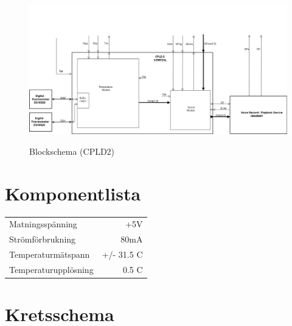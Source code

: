 \documentclass[a4paper,11pt]{article}
\begin{document}
		\begin{figure}[ht!tb]
		  \centering
		      \includegraphics[scale=0.48, angle=90]{BlockDiagramCPLD2.png}
			\label{fig:BlockDiagram2}
		  	\caption{Blockschema (CPLD2)}
		\end{figure}

	\section{Komponentlista}

		\begin{tabular}{ l r}
		   	Matningsspänning & +5V\\
		   	Strömförbrukning & ~80mA\\
		   	Temperaturmätspann & +/- 31.5 C\\
			Temperaturupplösning & 0.5 C\\	
		\end{tabular}

	\section{Kretsschema}
\end{document}
